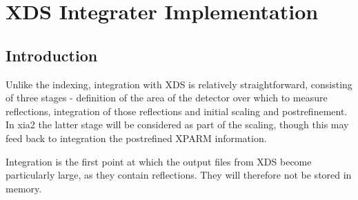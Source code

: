 \documentclass[a4paper, 11pt]{article}
\begin{document}
\section{XDS Integrater Implementation}

\subsection{Introduction}

Unlike the indexing, integration with XDS is relatively straightforward,
consisting of three stages - definition of the area of the detector
over which to measure reflections, integration of those reflections
and initial scaling and postrefinement. In xia2 the latter stage will be
considered as part of the scaling, though this may feed back to integration
the postrefined XPARM information.

Integration is the first point at which the output files from XDS become 
particularly large, as they contain reflections. They will therefore not
be stored in memory.
\end{document}
